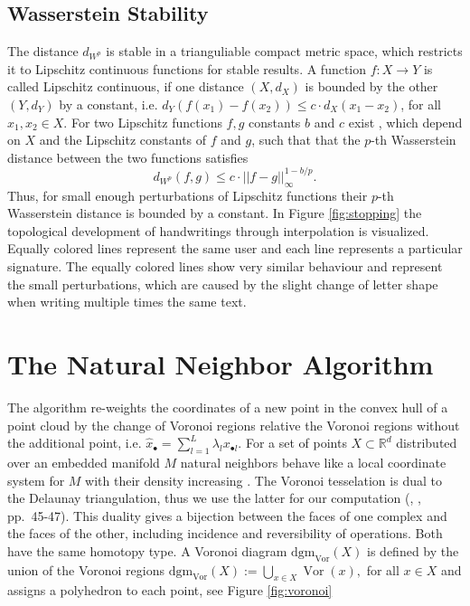 \documentclass{article}
\DeclareMathOperator{\Vor}{\text{Vor}}
\begin{document}
\subsection{Wasserstein Stability}
The distance $d_{W^p}$ is stable in a trianguliable compact metric space, which restricts it to Lipschitz continuous functions for stable results. A function $f: X \rightarrow Y$ is called Lipschitz continuous, if one distance $(X,d_X)$ is bounded by the other $(Y,d_Y)$ by a constant, i.e. $d_Y(f(x_1) - f(x_2)) \leq c \cdot d_X(x_1-x_2)$, for all $x_1, x_2 \in X.$ For two Lipschitz functions $f,g$ constants $b$ and $c$ exist \cite{cohen2010lipschitz}, which depend on $X$ and the Lipschitz constants of $f$ and $g$, such that that the $p$-th Wasserstein distance between the two functions satisfies
\begin{equation}
  d_{W^p}(f,g) \leq c \cdot ||f-g||_\infty^{1-b/p}.
\end{equation}
Thus, for small enough perturbations of Lipschitz functions their $p$-th Wasserstein distance is bounded by a constant. In Figure \ref{fig:stopping} the topological development of handwritings through interpolation is visualized. Equally colored lines represent the same user and each line represents a particular signature. The equally colored lines show very similar behaviour and represent the small perturbations, which are caused by the slight change of letter shape when writing multiple times the same text.

\section{The Natural Neighbor Algorithm}
\label{sec:natneighbor}

The algorithm re-weights the coordinates of a new point in the convex hull of a point cloud by the change of Voronoi regions relative the Voronoi regions without the additional point, i.e. $\hat{x}_{\bullet} = \sum_{l=1}^{L} \lambda_l x_{\bullet l}$. For a set of points $X \subset \mathbb{R}^d$ distributed over an embedded manifold $M$ natural neighbors behave like a local coordinate system for $M$ with their density increasing \cite{BoissonnatC01}. The Voronoi tesselation is dual to the Delaunay triangulation, thus we use the latter for our computation (\citeauthor{BoissonnatDG18}, \citeyear{BoissonnatDG18}, pp.~45-47). This duality gives a bijection between the faces of one complex and the faces of the other, including incidence and reversibility of operations. Both have the same homotopy type. A Voronoi diagram $\text{dgm}_{\Vor}(X)$ is defined by the union of the Voronoi regions $\text{dgm}_{\Vor}(X) := \bigcup_{x \in X} \Vor(x),$ for all $x \in X$ and assigns a polyhedron to each point, see Figure \ref{fig:voronoi}
\end{document}
